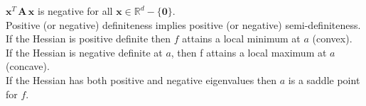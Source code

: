 $\mathbf{x}^ T \, \mathbf{A}\, \mathbf{x}$ is negative for all $\mathbf{x}\in \mathbb {R}^ d-\{ \mathbf{0}\}$.\\

Positive (or negative) definiteness implies positive (or negative) semi-definiteness.\\

If the Hessian is positive definite then $f$ attains a local minimum at $a$ (convex).\\

If the Hessian is negative definite at $a$, then f attains a local maximum at $a$ (concave).\\

If the Hessian has both positive and negative eigenvalues then $a$ is a saddle point for $f$.

